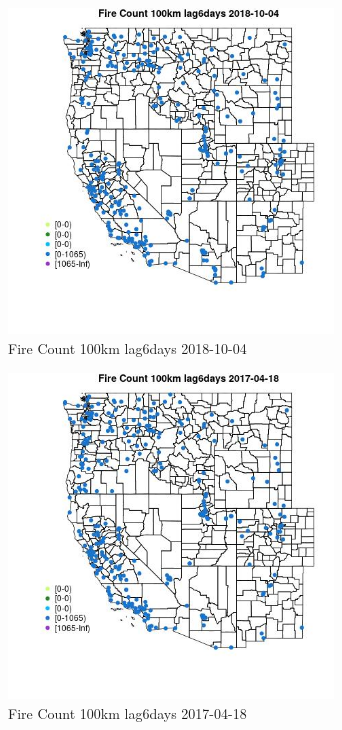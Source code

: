 \begin{figure} 
\centering  
\includegraphics[width=0.77\textwidth]{Code_Outputs/Report_ML_input_PM25_Step4_part_f_de_duplicated_aveswNAs_MapObsFire_Count_100km_lag6days2018-10-04.jpg} 
\caption{\label{fig:Report_ML_input_PM25_Step4_part_f_de_duplicated_aveswNAsMapObsFire_Count_100km_lag6days2018-10-04}Fire Count 100km lag6days 2018-10-04} 
\end{figure} 
 

\begin{figure} 
\centering  
\includegraphics[width=0.77\textwidth]{Code_Outputs/Report_ML_input_PM25_Step4_part_f_de_duplicated_aveswNAs_MapObsFire_Count_100km_lag6days2017-04-18.jpg} 
\caption{\label{fig:Report_ML_input_PM25_Step4_part_f_de_duplicated_aveswNAsMapObsFire_Count_100km_lag6days2017-04-18}Fire Count 100km lag6days 2017-04-18} 
\end{figure} 
 

